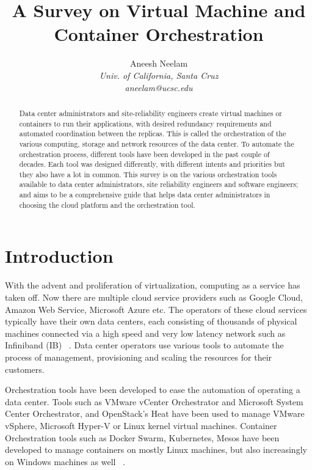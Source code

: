 \documentclass[10pt,twocolumn]{article}
\begin{document}
\title{A Survey on Virtual Machine and Container Orchestration}

\author{
Aneesh Neelam \\
\textit{Univ. of California, Santa Cruz} \\
\textit{aneelam@ucsc.edu}
}

\maketitle
\thispagestyle{empty}

\begin{abstract}

  Data center administrators and site-reliability engineers create virtual machines or containers to run their applications, with desired redundancy requirements and automated coordination between the replicas.
  This is called the orchestration of the various computing, storage and network resources of the data center.
  To automate the orchestration process, different tools have been developed in the past couple of decades.
  Each tool was designed differently, with different intents and priorities but they also have a lot in common.
  This survey is on the various orchestration tools available to data center administrators, site reliability engineers and software engineers;
  and aims to be a comprehensive guide that helps data center administrators in choosing the cloud platform and the orchestration tool.

\end{abstract}

\section{Introduction}

With the advent and proliferation of virtualization, computing as a service has taken off.
Now there are multiple cloud service providers such as Google Cloud, Amazon Web Service, Microsoft Azure etc.
The operators of these cloud services typically have their own data centers, each consisting of thousands of physical machines connected via a high speed and very low latency network such as Infiniband (IB) ~\cite{intro_infiniband}.
Data center operators use various tools to automate the process of management, provisioning and scaling the resources for their customers.

Orchestration tools have been developed to ease the automation of operating a data center.
Tools such as VMware vCenter Orchestrator and Microsoft System Center Orchestrator, and OpenStack's Heat have been used to manage VMware vSphere, Microsoft Hyper-V or Linux kernel virtual machines.
Container Orchestration tools such as Docker Swarm, Kubernetes, Mesos have been developed to manage containers on mostly Linux machines, but also increasingly on Windows machines as well ~\cite{docker_swarm, kubernetes, mesos}.
\end{document}
